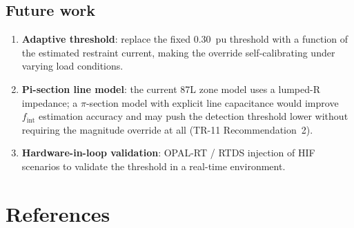 \documentclass[11pt,a4paper]{article}
\newcommand{\fint}{f_{\mathrm{int}}}
\begin{document}
\subsection*{Future work}

\begin{enumerate}
  \item \textbf{Adaptive threshold}: replace the fixed 0.30~pu threshold with
        a function of the estimated restraint current, making the override
        self-calibrating under varying load conditions.
  \item \textbf{Pi-section line model}: the current 87L zone model uses a
        lumped-R impedance; a $\pi$-section model with explicit line
        capacitance would improve $\fint$ estimation accuracy and may push the
        detection threshold lower without requiring the magnitude override at
        all (TR-11 Recommendation~2).
  \item \textbf{Hardware-in-loop validation}: OPAL-RT / RTDS injection of HIF
        scenarios to validate the threshold in a real-time environment.
\end{enumerate}

\section*{References}


\end{document}

